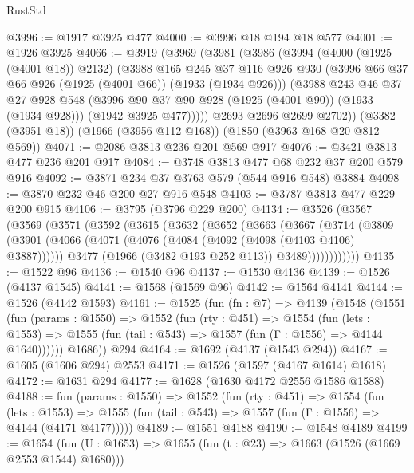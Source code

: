 \begin{lexlean}{RustStd}
\begin{coremodule}
@3996 := @1917 @3925 @477
@4000 := @3996 @18 @194 @18 @577
@4001 := @1926 @3925
@4066 := @3919
    (@3969
      (@3981
        (@3986
          (@3994
            (@4000 (@1925 (@4001 @18)) @2132)
            (@3988
              @165
              @245
              @37
              @116
              @926
              @930
              (@3996 @66 @37 @66 @926 (@1925 (@4001 @66)) (@1933 (@1934 @926)))
              (@3988
                @243
                @46
                @37
                @27
                @928
                @548
                (@3996 @90 @37 @90 @928 (@1925 (@4001 @90)) (@1933 (@1934 @928)))
                (@1942 @3925 @477)))))
        @2693
        @2696
        @2699
        @2702))
    (@3382 (@3951 @18))
    (@1966 (@3956 @112 @168))
    (@1850 (@3963 @168 @20 @812 @569))
@4071 := @2086 @3813 @236 @201 @569 @917
@4076 := @3421 @3813 @477 @236 @201 @917
@4084 := @3748 @3813 @477 @68 @232 @37 @200 @579 @916
@4092 := @3871 @234 @37 @3763 @579 (@544 @916 @548) @3884
@4098 := @3870 @232 @46 @200 @27 @916 @548
@4103 := @3787 @3813 @477 @229 @200 @915
@4106 := @3795 (@3796 @229 @200)
@4134 := @3526
    (@3567
      (@3569
        (@3571
          (@3592
            (@3615
              (@3632
                (@3652
                  (@3663
                    (@3667
                      (@3714
                        (@3809
                          (@3901
                            (@4066 (@4071 (@4076 (@4084 (@4092 (@4098 (@4103 @4106) @3887))))))
                            @3477
                            (@1966 (@3482 @193 @252 @113))
                            @3489))))))))))))
@4135 := @1522 @96
@4136 := @1540 @96
@4137 := @1530 @4136
@4139 := @1526 (@4137 @1545)
@4141 := @1568 (@1569 @96)
@4142 := @1564 @4141
@4144 := @1526 (@4142 @1593)
@4161 := @1525
    (fun (fn : @7) =>
    @4139
      (@1548
        (@1551
          (fun (params : @1550) =>
          @1552
            (fun (rty : @451) =>
            @1554
              (fun (lets : @1553) =>
              @1555 (fun (tail : @543) => @1557 (fun (Γ : @1556) => @4144 @1640))))))
        @1686))
    @294
@4164 := @1692 (@4137 (@1543 @294))
@4167 := @1605 (@1606 @294) @2553
@4171 := @1526 (@1597 (@4167 @1614) @1618)
@4172 := @1631 @294
@4177 := @1628 (@1630 @4172 @2556 @1586 @1588)
@4188 := fun (params : @1550) =>
  @1552
    (fun (rty : @451) =>
    @1554
      (fun (lets : @1553) =>
      @1555 (fun (tail : @543) => @1557 (fun (Γ : @1556) => @4144 (@4171 @4177)))))
@4189 := @1551 @4188
@4190 := @1548 @4189
@4199 := @1654 (fun (U : @1653) => @1655 (fun (t : @23) => @1663 (@1526 (@1669 @2553 @1544) @1680)))

\end{coremodule}
\end{lexlean}
